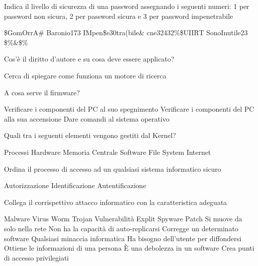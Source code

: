 \documentclass[addpoints]{exam}
\begin{document}
\begin{questions}
\question[1] Indica il livello di sicurezza di una password assegnando i seguenti numeri: 1 per password non sicura, 2 per password sicura e 3 per password impenetrabile

\begin{oneparcheckboxes}
	\choice \$GomOrrA\#
	\choice Baronio173
	\choice IMpen\$e30tra(bile\&
	\choice cne32432\%\$UII\=RT
	\choice SonoInutile23
	\choice \$\%\&\$\%
\end{oneparcheckboxes}

\question[2] Cos’è il diritto d’autore e su cosa deve essere applicato?
\fillwithlines{1in}

\question[3] Cerca di spiegare come funziona un motore di ricerca
\fillwithlines{2in}

\question[1] A cosa serve il firmware?

\begin{checkboxes}
	\choice Verificare i componenti del PC al suo spegnimento
	\choice Verificare i componenti del PC alla sua accensione
	\choice Dare comandi al sistema operativo
\end{checkboxes}

\question[1] Quali tra i seguenti elementi vengono gestiti dal Kernel?

\begin{oneparcheckboxes}
	\choice Processi
	\choice Hardware
	\choice Memoria Centrale
	\choice Software
	\choice File System
	\choice Internet
\end{oneparcheckboxes}	

\question[1] Ordina il processo di accesso ad un qualsiasi sistema informatico sicuro

\begin{oneparcheckboxes}
	\choice Autorizzazione
	\choice Identificazione
	\choice Autentificazione
\end{oneparcheckboxes}	

\question[3] Collega il corrispettivo attacco informatico con la caratteristica adeguata

\begin{multicols}{2}
	\begin{checkboxes}
		\choice Malware
		\choice Virus
		\choice Worm
		\choice Trojan
		\choice Vulnerabilità
		\choice Explit
		\choice Spyware
		\choice Patch
		\choice Si muove da solo nella rete
		\choice Non ha la capacità di auto-replicarsi
		\choice Corregge un determinato software
		\choice Qualsiasi minaccia informatica
		\choice Ha bisogno dell’utente per diffondersi
		\choice Ottiene le informazioni di una persona
		\choice È una debolezza in un software
		\choice Crea punti di
		accesso privilegiati
	\end{checkboxes}	
\end{multicols}
 
\end{questions}

\begin{center}
	\combinedgradetable[h][questions]
\end{center}
\end{document}
